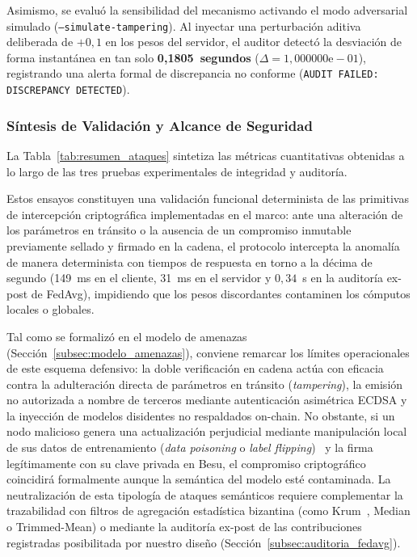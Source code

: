 Asimismo, se evaluó la sensibilidad del mecanismo activando el modo adversarial simulado (\texttt{--simulate-tampering}). Al inyectar una perturbación aditiva deliberada de $+0{,}1$ en los pesos del servidor, el auditor detectó la desviación de forma instantánea en tan solo \textbf{0,1805~segundos} ($\Delta = 1{,}000000\text{e}-01$), registrando una alerta formal de discrepancia no conforme (\texttt{AUDIT FAILED: DISCREPANCY DETECTED}).

\subsubsection{Síntesis de Validación y Alcance de Seguridad}
La Tabla~\ref{tab:resumen_ataques} sintetiza las métricas cuantitativas obtenidas a lo largo de las tres pruebas experimentales de integridad y auditoría.

Estos ensayos constituyen una validación funcional determinista de las primitivas de intercepción criptográfica implementadas en el marco: ante una alteración de los parámetros en tránsito o la ausencia de un compromiso inmutable previamente sellado y firmado en la cadena, el protocolo intercepta la anomalía de manera determinista con tiempos de respuesta en torno a la décima de segundo (149~ms en el cliente, 31~ms en el servidor y $0{,}34$~s en la auditoría ex-post de FedAvg), impidiendo que los pesos discordantes contaminen los cómputos locales o globales.

Tal como se formalizó en el modelo de amenazas (Sección~\ref{subsec:modelo_amenazas}), conviene remarcar los límites operacionales de este esquema defensivo: la doble verificación en cadena actúa con eficacia contra la adulteración directa de parámetros en tránsito (\textit{tampering}), la emisión no autorizada a nombre de terceros mediante autenticación asimétrica ECDSA y la inyección de modelos disidentes no respaldados on-chain. No obstante, si un nodo malicioso genera una actualización perjudicial mediante manipulación local de sus datos de entrenamiento (\textit{data poisoning} o \textit{label flipping})~\cite{tolpegin2020data} y la firma legítimamente con su clave privada en Besu, el compromiso criptográfico coincidirá formalmente aunque la semántica del modelo esté contaminada. La neutralización de esta tipología de ataques semánticos requiere complementar la trazabilidad con filtros de agregación estadística bizantina (como Krum~\cite{blanchard2017byzantine}, Median o Trimmed-Mean) o mediante la auditoría ex-post de las contribuciones registradas posibilitada por nuestro diseño (Sección~\ref{subsec:auditoria_fedavg}).

